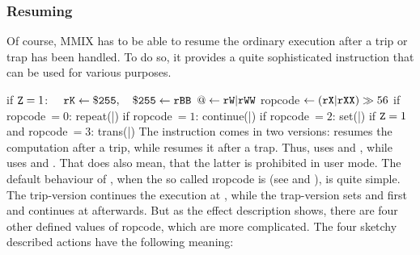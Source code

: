 \subsubsection{Resuming}

Of course, MMIX has to be able to resume the ordinary execution after a trip or trap has been handled. To do so, it provides a quite sophisticated instruction that can be used for various purposes.

\instrtbleight
	{}
	{if ${\tt Z} = 1$:}
	{$\quad {\tt rK} \leftarrow {\tt \$255},\quad {\tt \$255} \leftarrow {\tt rBB}$}
	{$@ \leftarrow {\tt rW}|{\tt rWW}$}
	{ropcode$~\leftarrow ({\tt rX}|{\tt rXX}) \gg 56$}
	{if ropcode$~= 0$: repeat(|)}
	{if ropcode$~= 1$: continue(|)}
	{if ropcode$~= 2$: set(|)}
	{if ${\tt Z} = 1~$and ropcode$~= 3$: trans(|)}
\noindent The instruction  comes in two versions:  resumes the computation after a trip, while  resumes it after a trap. Thus,  uses  and , while  uses  and . That does also mean, that the latter is prohibited in user mode. The default behaviour of , when the so called \i{ropcode} is  (see  and ), is quite simple. The trip-version continues the execution at , while the trap-version sets  and  first and continues at  afterwards. But as the effect description shows, there are four other defined values of ropcode, which are more complicated. The four sketchy described actions have the following meaning:
